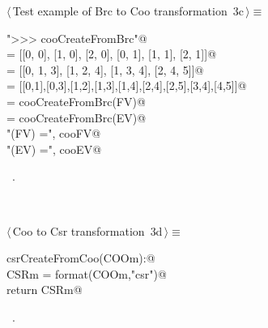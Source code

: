 \documentclass[11pt,oneside]{article}	%
\begin{document}
\begin{flushleft} \small
\begin{minipage}{\linewidth} \label{scrap3}
\protect{}$\langle\,$Test example of Brc to Coo transformation\nobreak\ {\footnotesize 3c}$\,\rangle\equiv$
\vspace{-1ex}
\begin{list}{}{} \item
\mbox{}\verb@print "\n>>> cooCreateFromBrc"@\\
\mbox{}\verb@V = [[0, 0], [1, 0], [2, 0], [0, 1], [1, 1], [2, 1]]@\\
\mbox{}\verb@FV = [[0, 1, 3], [1, 2, 4], [1, 3, 4], [2, 4, 5]]@\\
\mbox{}\verb@EV = [[0,1],[0,3],[1,2],[1,3],[1,4],[2,4],[2,5],[3,4],[4,5]]@\\
\mbox{}\verb@cooFV = cooCreateFromBrc(FV)@\\
\mbox{}\verb@cooEV = cooCreateFromBrc(EV)@\\
\mbox{}\verb@print "\ncooCreateFromBrc(FV) =\n", cooFV@\\
\mbox{}\verb@print "\ncooCreateFromBrc(EV) =\n", cooEV@\\
\mbox{}\verb@@{\NWsep}
\end{list}
\vspace{-1ex}
\footnotesize\addtolength{\baselineskip}{-1ex}
\begin{list}{}{\setlength{\itemsep}{-\parsep}\setlength{\itemindent}{-\leftmargin}}
\item \NWtxtMacroRefIn\ .
\end{list}
\end{minipage}\\[4ex]
\end{flushleft}
\begin{flushleft} \small
\begin{minipage}{\linewidth} \label{scrap4}
\protect{}$\langle\,$Coo to Csr transformation\nobreak\ {\footnotesize 3d}$\,\rangle\equiv$
\vspace{-1ex}
\begin{list}{}{} \item
\mbox{}\verb@def csrCreateFromCoo(COOm):@\\
\mbox{}\verb@    CSRm = format(COOm,"csr")@\\
\mbox{}\verb@    return CSRm@\\
\mbox{}\verb@@{\NWsep}
\end{list}
\vspace{-1ex}
\footnotesize\addtolength{\baselineskip}{-1ex}
\begin{list}{}{\setlength{\itemsep}{-\parsep}\setlength{\itemindent}{-\leftmargin}}
\item \NWtxtMacroRefIn\ .
\end{list}
\end{minipage}\\[4ex]
\end{flushleft}
\end{document}
